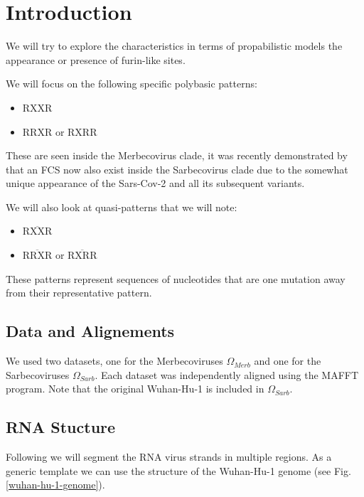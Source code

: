 \documentclass[pdflatex,sn-basic,iicol]{sn-jnl}%
\begin{document}



\maketitle

\section{Introduction}\label{intro}
We will try to explore the characteristics in terms of propabilistic models the appearance or presence of furin-like sites. 

We will focus on the following specific polybasic patterns:
\begin{itemize}
    \item $\text{RXXR}$
    \item $\text{RRXR}$ or $\text{RXRR}$
\end{itemize}
These are seen inside the Merbecovirus clade, it was recently demonstrated by \cite{COUTARD2020104742} that an FCS now also exist inside 
the Sarbecovirus clade due to the somewhat unique appearance of the Sars-Cov-2 and all its subsequent variants.

We will also look at quasi-patterns that we will note:
\begin{itemize}
    \item $\overline{\text{RXXR}}$
    \item $\overline{\text{RRXR}}$ or $\overline{\text{RXRR}}$
\end{itemize}
These patterns represent sequences of nucleotides that are one mutation away from their representative pattern.

\subsection{Data and Alignements}
We used two datasets, one for the Merbecoviruses $\Omega_{Merb}$ and one for the Sarbecoviruses $\Omega_{Sarb}$. 
Each dataset was independently aligned using the MAFFT program.
Note that the original Wuhan-Hu-1 is included in $\Omega_{Sarb}$.

\subsection{RNA Stucture}
Following \cite{WU2021102115} we will segment the RNA virus strands in multiple regions. 
As a generic template we can use the structure of the Wuhan-Hu-1 genome (see Fig.\ref{wuhan-hu-1-genome}). 
\end{document}
